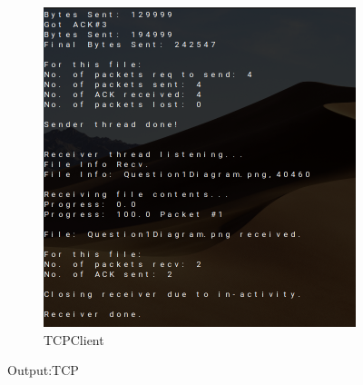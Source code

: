 \documentclass{article}
\begin{document}
\begin{enumerate}
\begin{figure}[h]
\begin{subfigure}{.5\textwidth}
\includegraphics[width=350pt]{Output2}
\caption{TCPClient}
\label{TCPClient}
\end{subfigure}
\caption{Output:TCP}
\label{fig:TCP}
\end{figure}

\pagebreak


\end{enumerate}
\end{document}
